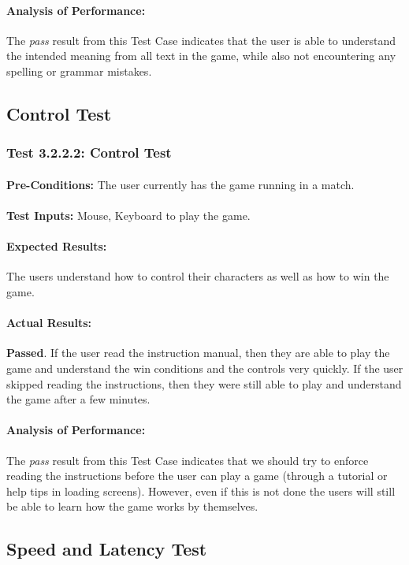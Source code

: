 \documentclass{article}
\begin{document}
    \paragraph{Analysis of Performance:} The \emph{pass} result from this Test Case indicates that the user is able to understand the intended meaning from all text in the game, while also not encountering any spelling or grammar mistakes. 
\subsection{Control Test}
\subsubsection{Test 3.2.2.2: Control Test }
    \paragraph{}\textbf{Pre-Conditions:} The user currently has the game running in a match.
    \paragraph{}\textbf{Test Inputs:} Mouse, Keyboard to play the game.
    \paragraph{Expected Results:} The users understand how to control their characters as well as how to win the game.
    \paragraph{Actual Results:} \textbf{Passed}. If the user read the instruction manual, then they are able to play the game and understand the win conditions and the controls very quickly. If the user skipped reading the instructions, then they were still able to play and understand the game after a few minutes.
    \paragraph{Analysis of Performance:} The \emph{pass} result from this Test Case indicates that we should try to enforce reading the instructions before the user can play a game (through a tutorial or help tips in loading screens). However, even if this is not done the users will still be able to learn how the game works by themselves.
\subsection{Speed and Latency Test}
\end{document}
